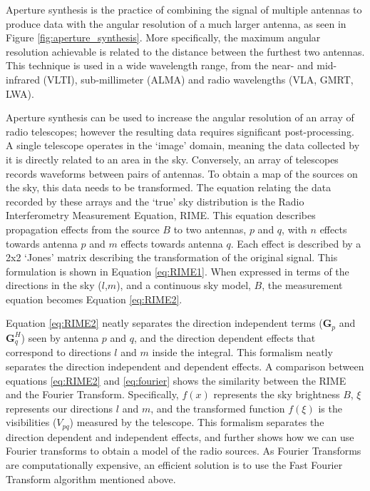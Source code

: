 Aperture synthesis is the practice of combining the signal of multiple antennas to produce data with the angular resolution of a much larger antenna, as seen in Figure \ref{fig:aperture_synthesis}. More specifically, the maximum angular resolution achievable is related to the distance between the furthest two antennas. This technique is used in a wide wavelength range, from the near- and mid-infrared (VLTI), sub-millimeter (ALMA) and radio wavelengths (VLA, GMRT, LWA). 

Aperture synthesis can be used to increase the angular resolution of an array of radio telescopes; however the resulting data requires significant post-processing. A single telescope operates in the `image' domain, meaning the data collected by it is directly related to an area in the sky. Conversely, an array of telescopes records waveforms between pairs of antennas. To obtain a map of the sources on the sky, this data needs to be transformed. The equation relating the data recorded by these arrays and the `true' sky distribution is the Radio Interferometry Measurement Equation, RIME. This equation describes propagation effects from the source $B$ to two antennas, $p$ and $q$, with $n$ effects towards antenna $p$ and $m$ effects towards antenna $q$. Each effect is described by a 2x2 `Jones' matrix describing the transformation of the original signal. This formulation is shown in Equation \ref{eq:RIME1}. When expressed in terms of the directions in the sky ($l$,$m$), and a continuous sky model, $B$, the measurement equation becomes Equation \ref{eq:RIME2}. 

Equation \ref{eq:RIME2} neatly separates the direction independent terms ($\bm{G}_p$ and $\bm{G}^H_q$) seen by antenna $p$ and $q$, and the direction dependent effects that correspond to directions $l$ and $m$ inside the integral. This formalism neatly separates the direction independent and dependent effects. A comparison between equations \ref{eq:RIME2} and \ref{eq:fourier} shows the similarity between the RIME and the Fourier Transform. Specifically, $f(x)$ represents the sky brightness $B$, $\xi$ represents our directions $l$ and $m$, and the transformed function $f(\xi)$ is the visibilities ($V_{pq}$) measured by the telescope. This formalism separates the direction dependent and independent effects, and further shows how we can use Fourier transforms to obtain a model of the radio sources. As Fourier Transforms are computationally expensive, an efficient solution is to use the Fast Fourier Transform algorithm mentioned above.

